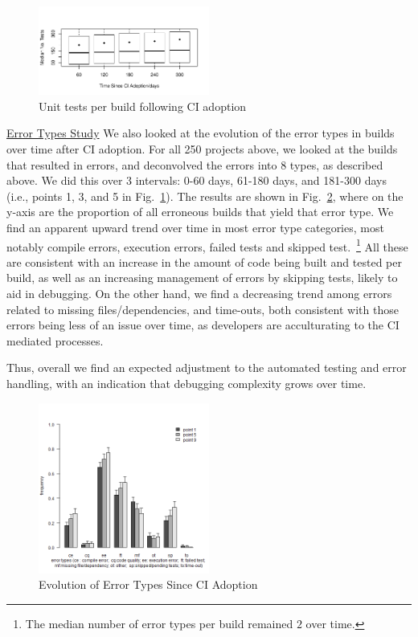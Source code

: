 \begin{figure}[!t]
\centering
\includegraphics[width=0.5\textwidth]{tests.pdf}
\caption{Unit tests per build following CI adoption}
\label{Fig:Tests}
\end{figure}

\noindent \underline{Error Types Study}
We also looked at the evolution of the error types in builds over time after CI adoption.
For all 250 projects above, we looked at the builds that resulted in errors, and deconvolved the 
errors into 8 types, as described above.
We did this over 3 intervals: 0-60 days, 61-180 days, and 181-300 days (i.e., points 1, 3, and  5 in Fig.~\ref{Fig:Tests}).
The results are shown in Fig.~\ref{Fig:BugTypes}, where
on the y-axis are the proportion of all erroneous builds that yield that error type.
We find an apparent upward trend over time in most error type categories, most notably compile errors, execution errors, failed tests and skipped test.~\footnote{The median number of error types per build remained $2$ over time.}
All these are consistent with an increase in the amount of code being built and tested per build, as well as an increasing management of errors by skipping tests, likely to aid in debugging.
On the other hand, we find a decreasing trend among errors related to missing files/dependencies, and time-outs, both consistent with those errors being less of an issue over time, as developers are acculturating to the CI mediated processes.

Thus, overall we find an expected adjustment to the automated testing and error handling, with an indication that debugging complexity grows over time.

\begin{figure}[!t]
\centering
\includegraphics[width=0.5\textwidth]{plot_together.png}
\caption{Evolution of Error Types Since CI Adoption}
\label{Fig:BugTypes}
\end{figure}



